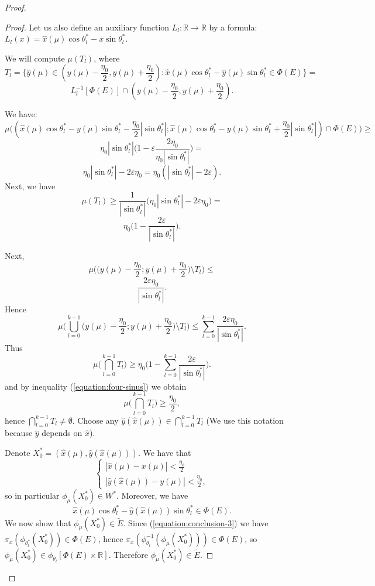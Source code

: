 \documentclass[12pt]{amsart}
\theoremstyle{plain}
\theoremstyle{definition}
\theoremstyle{remark}
\newcommand{\real}{\mathbb{R}}
\newcommand{\yxMu}{\hat{y}(\hat{x}(\mu))}
\begin{document}
\begin{proof}
\begin{proof}
Let us also define an auxiliary function $L_l \colon \real \to \real$
by a formula:
$L_l(x) = \hat{x}(\mu) \cos \theta^*_l - x \sin \theta^*_l$.

We will compute $\mu(T_l)$, where 
\[
  T_l = \bigl\lbrace
  \hat{y}(\mu) \in (y(\mu) - \frac{\eta_0}{2}, y(\mu) + \frac{\eta_0}{2}) \colon
  \hat{x}(\mu) \cos \theta^*_l - \hat{y}(\mu) \sin \theta^*_l \in \Phi(E)
  \bigl\rbrace =
\]
\[
  L_l^{-1}[\Phi(E)] \cap (y(\mu) - \frac{\eta_0}{2}, y(\mu) + \frac{\eta_0}{2}).
\]

We have:
\[
  \mu\big( (\hat{x}(\mu) \cos \theta^*_l - y(\mu) \sin \theta^*_l - \frac{\eta_0}{2} | \sin \theta^*_l|;
  \hat{x}(\mu) \cos \theta^*_l - y(\mu) \sin \theta^*_l + \frac{\eta_0}{2} | \sin \theta^*_l|)
  \cap \Phi(E) \big) \geq
\]
\[
  \eta_0 |\sin \theta^*_l| \big(1 - \varepsilon\frac{2 \eta_0}{\eta_0 |\sin \theta^*_l|}\big) =
\]
\[
  \eta_0 |\sin \theta^*_l| - 2 \varepsilon \eta_0 =  \eta_0 (|\sin \theta^*_l| - 2 \varepsilon).
\]
Next, we have
\[
\mu(T_l) \geq \frac{1}{|\sin \theta^*_l|} \big( \eta_0 |\sin \theta^*_l| - 2 \varepsilon \eta_0\big) =
\]
\[
\eta_0 \big(1 - \frac{2 \varepsilon}{|\sin \theta^*_l|}\big).
\]

Next,
\[
  \mu\Big(\big(y(\mu) - \frac{\eta_0}{2}; y(\mu) + \frac{\eta_0}{2}\big) \setminus T_l\Big) \leq
\]
\[
  \frac{2 \varepsilon \eta_0}{|\sin \theta^*_l|}.
\]
Hence
\[
  \mu\Big( \bigcup_{l = 0}^{k - 1} \big(y(\mu) - \frac{\eta_0}{2};
  y(\mu) + \frac{\eta_0}{2}\big) \setminus T_l\Big) \leq
  \sum_{l = 0}^{k - 1} \frac{2 \varepsilon \eta_0}{|\sin \theta^*_l|}.
\]
Thus
\[
  \mu\big(\bigcap_{l=0}^{k-1} T_l \big) \geq \eta_0
  \big(1 - \sum_{l = 0}^{k - 1} \frac{2 \varepsilon}{|\sin \theta^*_l|}\big).
\]
and by inequality (\ref{equation:four-sinus}) we obtain
\[
  \mu\big(\bigcap_{l=0}^{k-1} T_l \big) \geq \frac{\eta_0}{2},
\]
hence $\bigcap_{l=0}^{k-1} T_l\not=\emptyset$.
Choose any 
$\yxMu \in \bigcap_{l=0}^{k-1} T_l$
(We use this notation because $\hat{y}$ depends on $\hat{x}$).

Denote $X^*_0 = (\hat{x}(\mu), \yxMu)$.
We have that
\[
  \left\{
    \begin{array}{l}
    |\hat{x}(\mu) - x(\mu)| < \frac{\eta_0}{2} \\
    |\yxMu - y(\mu)| < \frac{\eta_0}{2},
    \end{array}
  \right.
\]
so in particular $\phi_{\mu}(X^*_0) \in W^*$.
Moreover, we have
\begin{equation}\label{equation:conclusion-3}
\hat{x}(\mu) \cos \theta^*_l - \yxMu \sin \theta^*_l \in \Phi(E).
\end{equation}
We now show that $\phi_\mu(X^*_0) \in \tilde{E}$.
Since (\ref{equation:conclusion-3}) we have
$\pi_x(\phi_{\theta^*_l}(X^*_0)) \in \Phi(E)$,
hence
$\pi_x(\phi_{\theta_l}^{-1}(\phi_{\mu}(X^*_0))) \in \Phi(E)$,
so
$\phi_{\mu}(X^*_0) \in \phi_{\theta_l}[\Phi(E) \times \real]$.
Therefore
$\phi_{\mu}(X^*_0) \in \tilde{E}$.
\end{proof}


\end{proof}
\end{document}
